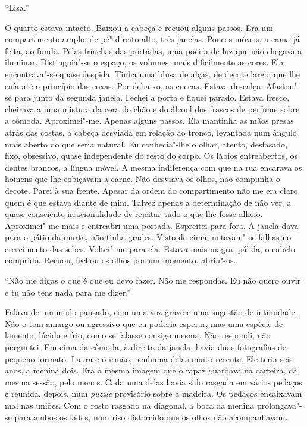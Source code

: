 ``Lisa.''

O quarto estava intacto. Baixou a cabeça e recuou alguns passos. Era um
compartimento amplo, de pé"-direito alto, três janelas. Poucos móveis, a
cama já feita, ao fundo. Pelas frinchas das portadas, uma poeira de luz
que não chegava a iluminar. Distinguia"-se o espaço, os volumes, mais
dificilmente as cores. Ela encontrava"-se quase despida. Tinha uma blusa
de alças, de decote largo, que lhe caía até o princípio das coxas. Por
debaixo, as cuecas. Estava descalça. Afastou"-se para junto da segunda
janela. Fechei a porta e fiquei parado. Estava fresco, cheirava a uma
mistura da cera do chão e do álcool dos frascos de perfume sobre a
cômoda. Aproximei"-me. Apenas alguns passos. Ela mantinha as mãos presas
atrás das costas, a cabeça desviada em relação ao tronco, levantada num
ângulo mais aberto do que seria natural. Eu conhecia"-lhe o olhar,
atento, desfasado, fixo, obsessivo, quase independente do resto do
corpo. Os lábios entreabertos, os dentes brancos, a língua móvel. A
mesma indiferença com que na rua encarava os homens que lhe cobiçavam a
carne. Não desviava os olhos, não compunha o decote. Parei à sua frente.
Apesar da ordem do compartimento não me era claro quem é que estava
diante de mim. Talvez apenas a determinação de não ver, a quase
consciente irracionalidade de rejeitar tudo o que lhe fosse alheio.
Aproximei"-me mais e entreabri uma portada. Espreitei para fora. A
janela dava para o pátio da murta, não tinha grades. Visto de cima,
notavam"-se falhas no crescimento das sebes. Voltei"-me para ela. Estava
mais magra, pálida, o cabelo comprido. Recuou, fechou os olhos por um
momento, abriu"-os.

``Não me digas o que é que eu devo fazer. Não me respondas. Eu não quero
ouvir e tu não tens nada para me dizer.''

Falava de um modo pausado, com uma voz grave e uma sugestão de
intimidade. Não o tom amargo ou agressivo que eu poderia esperar, mas
uma espécie de lamento, lúcido e frio, como se falasse consigo mesma.
Não respondi, não perguntei. Em cima da cômoda, à direita da janela,
havia duas fotografias de pequeno formato. Laura e o irmão, nenhuma
delas muito recente. Ele teria seis anos, a menina dois. Era a mesma
imagem que o rapaz guardava na carteira, da mesma sessão, pelo menos.
Cada uma delas havia sido rasgada em vários pedaços e reunida, depois,
num \emph{puzzle} provisório sobre a madeira. Os pedaços encaixavam mal
nas uniões. Com o rosto rasgado na diagonal, a boca da menina
prolongava"-se para ambos os lados, num riso distorcido que os olhos não
acompanhavam.

